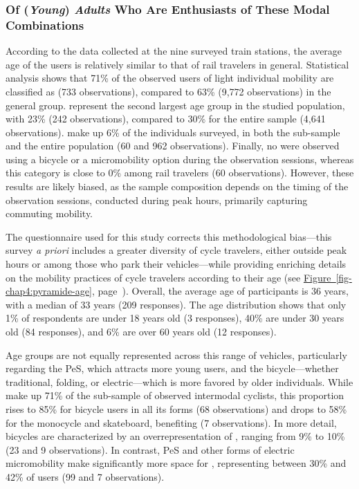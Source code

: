 \begin{refsegment}
\subsubsection*{Of (\textsl{Young}) \textsl{Adults} Who Are Enthusiasts of These Modal Combinations
    \label{chap4:demographie-age}
    }

According to the data collected at the nine surveyed train stations, the average age of the users is relatively similar to that of rail travelers in general. Statistical analysis shows that 71\% of the observed users of light individual mobility are classified as  (733 observations), compared to 63\% (9,772 observations) in the general group.  represent the second largest age group in the studied population, with 23\% (242 observations), compared to 30\% for the entire sample (4,641 observations).  make up 6\% of the individuals surveyed, in both the sub-sample and the entire population (60 and 962 observations). Finally, no  were observed using a bicycle or a micromobility option during the observation sessions, whereas this category is close to 0\% among rail travelers (60 observations). However, these results are likely biased, as the sample composition depends on the timing of the observation sessions, conducted during peak hours, primarily capturing commuting mobility.%

The questionnaire used for this study corrects this methodological bias—this survey \textsl{a priori} includes a greater diversity of  cycle travelers, either outside peak hours or among those who park their vehicles—while providing enriching details on the mobility practices of cycle travelers according to their age (see \hyperref[fig-chap4:pyramide-age]{Figure~\ref{fig-chap4:pyramide-age}}, page~\pageref{fig-chap4:pyramide-age}). Overall, the average age of participants is 36 years, with a median of 33 years (209 responses). The age distribution shows that only 1\% of respondents are under 18 years old (3 responses), 40\% are under 30 years old (84 responses), and 6\% are over 60 years old (12 responses).%

Age groups are not equally represented across this range of vehicles, particularly regarding the \acrshort{PeS}, which attracts more young users, and the bicycle—whether traditional, folding, or electric—which is more favored by older individuals. While  make up 71\% of the sub-sample of observed intermodal cyclists, this proportion rises to 85\% for bicycle users in all its forms (68 observations) and drops to 58\% for the monocycle and skateboard, benefiting  (7 observations). In more detail, bicycles are characterized by an overrepresentation of , ranging from 9\% to 10\% (23 and 9 observations). In contrast, \acrshort{PeS} and other forms of electric micromobility make significantly more space for , representing between 30\% and 42\% of users (99 and 7 observations).%


\end{refsegment}
